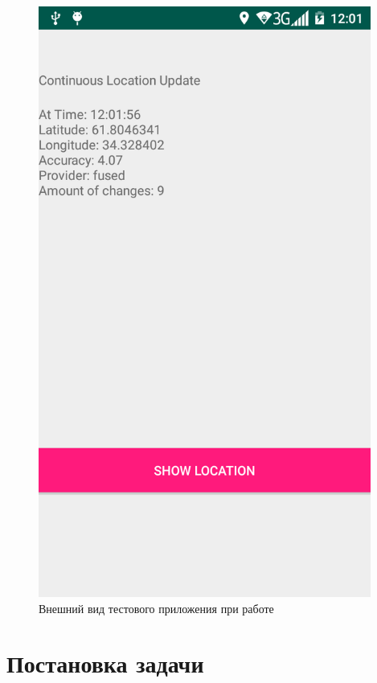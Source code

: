 \documentclass[a4paper,12pt]{article}
\begin{document}
\begin{figure}
	\centering
	\includegraphics[width=10.94cm]{images/Screenshot_2018-12-07-12-01-59.png}
	\caption{Внешний вид тестового приложения при работе}
	\label{fig:card}
\end{figure}



\pagebreak


\section{Постановка задачи}
\end{document}
